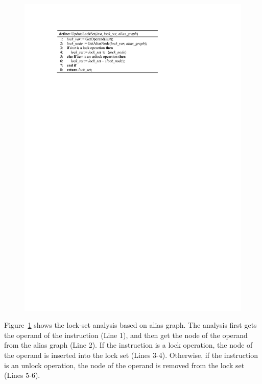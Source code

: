 \begin{figure}[htbp]
	\centering
	\includegraphics[width=0.9\linewidth]{figures/fig_pseudocode_lock_set.pdf}
	\label{fig_pseudocode_lock_set}
\end{figure}

Figure~\ref{fig_pseudocode_lock_set} shows the lock-set analysis based on alias 
graph. The analysis first gets the operand of the instruction (Line 1), and 
then get the node of the operand from the alias graph (Line 2). If the 
instruction is a lock operation, the node of the operand is inserted into the 
lock set (Lines 3-4). Otherwise, if the instruction is an unlock operation, the 
node of the operand is removed from the lock set (Lines 5-6).

